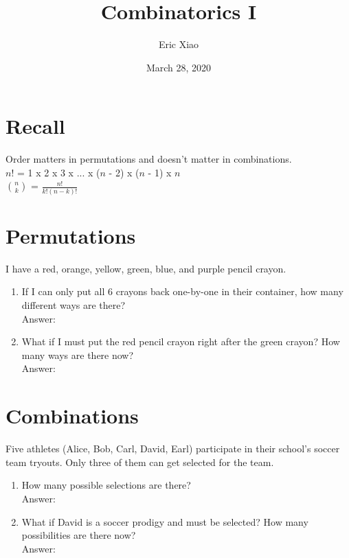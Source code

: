 \documentclass[11pt]{extarticle}
\title{Combinatorics I}
\author{Eric Xiao}
\date{March 28, 2020}
\begin{document}
\maketitle

\section{Recall}
\large{Order matters in permutations and doesn't matter in combinations.\\}
\large{$n!$ = 1 x 2 x 3 x ... x ($n$ - 2) x ($n$ - 1) x $n$\\}
\large{$\binom{n}{k}$ = $\frac{n!}{k!(n - k)!}$}

\section{Permutations}
{I have a red, orange, yellow, green, blue, and purple pencil crayon.}
\begin{enumerate}
    \itemsep 2.0em
    \item {If I can only put all 6 crayons back one-by-one in their container, how many different ways are there? \\Answer: }
    \item {What if I must put the red pencil crayon right after the green crayon? How many ways are there now? \\Answer: }
\end{enumerate}

\section{Combinations}
{Five athletes (Alice, Bob, Carl, David, Earl) participate in their school's soccer team tryouts. Only three of them can get selected for the team.}
\begin{enumerate}
    \itemsep 2.0em
    \item {How many possible selections are there? \\Answer: }
    \item {What if David is a soccer prodigy and must be selected? How many possibilities are there now? \\Answer: }
\end{enumerate}

\bigskip
\end{document}
